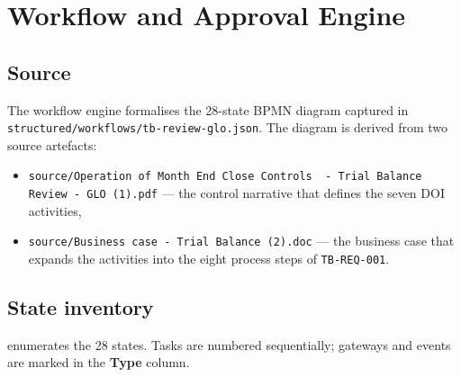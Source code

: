 \chapter{Workflow and Approval Engine}\label{ch:workflow}

\section{Source}

The workflow engine formalises the 28-state BPMN diagram captured in
\corpus\texttt{structured/workflows/tb-review-glo.json}. The diagram
is derived from two source artefacts:

\begin{itemize}
  \item \corpus\texttt{source/Operation of Month End Close Controls\ \ - Trial Balance Review - GLO (1).pdf}
        --- the control narrative that defines the seven DOI activities,
  \item \corpus\texttt{source/Business case - Trial Balance (2).doc}
        --- the business case that expands the activities into the
        eight process steps of \texttt{TB-REQ-001}.
\end{itemize}

\section{State inventory}

 enumerates the 28 states. Tasks are numbered
sequentially; gateways and events are marked in the \textbf{Type}
column.


